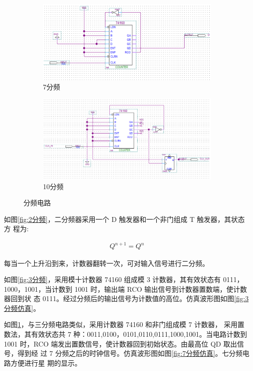 \documentclass[twoside, openright]{article}
\begin{document}
\begin{figure}[htbp]
	\begin{subfigure}[htbp]{.45\linewidth}
		\centering
		\includegraphics[width=\linewidth]{7.png}
		\caption{7分频}
		\label{fig:7分频}
	\end{subfigure}
	\quad
	\begin{subfigure}[htbp]{.45\linewidth}
		\centering
		\includegraphics[width=\linewidth]{10.png}
		\caption{10分频}
		\label{fig:10分频}
	\end{subfigure}

	\caption{分频电路}
	\label{fig:分频电路}
\end{figure}

如图\ref{fig:2分频}，二分频器采用一个 D 触发器和一个非门组成 T 触发器，其状态方
程为:

\begin{align}
	Q^{n + 1} = Q^n
\end{align}

每当一个上升沿到来，计数器翻转一次，可对输入信号进行二分频。

如图\ref{fig:3分频}，采用模十计数器 74160 组成模 3 计数器，其有效状态有 0111，
1000，1001，当计数到 1001 时，输出端 RCO 输出信号到计数器置数端，使计数器回到状
态 0111。经过分频后的输出信号为计数值的高位。仿真波形图如图\ref{fig:3分频仿真}。

如图\ref{fig:7分频}，与三分频电路类似，采用计数器 74160 和非门组成模 7 计数器，
采用置数法，其有效状态共 7 种：0011,0100，0101,0110,0111,1000,1001。当电路计数到
1001 时，RCO 端发出置数信号，使计数器回到初始状态。由最高位 QD 取出信号，得到经
过 7 分频之后的时钟信号。仿真波形图如图\ref{fig:7分频仿真}。七分频电路方便进行星
期的显示。
\end{document}
